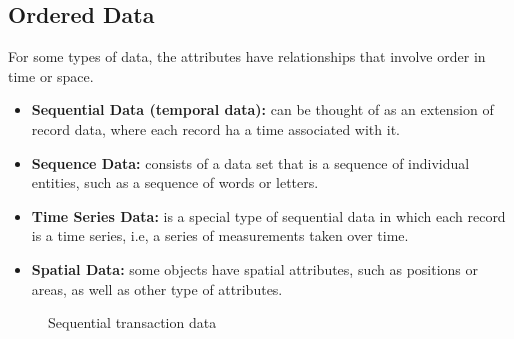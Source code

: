 		\clearpage
		\subsection*{Ordered Data}
		For some types of data, the attributes have relationships that involve order in time or space. 
			\begin{itemize}
				\item {\bf Sequential Data (temporal data):} can be thought of as an extension of record data, 
				where each record ha a time associated with it. 
				\item {\bf Sequence Data:} consists of a data set that is a sequence of individual entities, 
				such as a sequence of words or letters. 
				\item {\bf Time Series Data:} is a special type of sequential data in which each record is a
				time series, i.e, a series of measurements taken over time. 
				\item {\bf Spatial Data:} some objects have spatial attributes, such as positions or areas, as
				well as other type of attributes. 
			\end{itemize}

		\begin{figure}[H]
			\centering
			\caption{Sequential transaction data}
		\end{figure}

